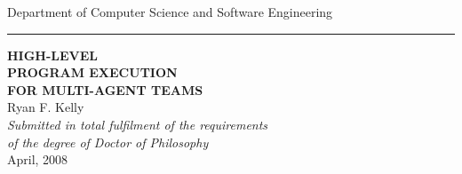 \documentclass[a4paper,12pt,openany]{book}
\begin{document}

\begin{titlepage}
\begin{center}
{\Large Department of Computer Science and Software Engineering}\\ \vspace{0.1cm}
\rule{150mm}{0.5mm}

\vspace{1cm}
{\bf\LARGE   HIGH-LEVEL }\\ \vspace{0.3cm} %
{\bf\LARGE   PROGRAM EXECUTION }\\ \vspace{0.3cm} %
{\bf\LARGE   FOR MULTI-AGENT TEAMS } \\ %
\vspace{2cm}
{\LARGE      Ryan F. Kelly       }\\
\vspace{5cm}
{\em\large Submitted in total fulfilment of the requirements}\\ \vspace{0.1cm}
{\em\large        of the degree of Doctor of Philosophy     }\\
\vspace{0.5cm}
{\Large             April, 2008        }\\
\vspace{0.5cm}
\end{center}
\end{titlepage}


\end{document}

